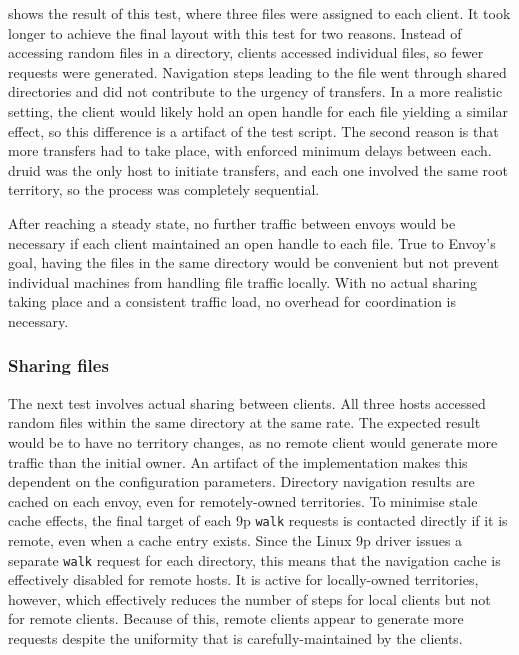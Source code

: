  shows the result of this test, where three files were assigned to each client. It took longer to achieve the final layout with this test for two reasons. Instead of accessing random files in a directory, clients accessed individual files, so fewer requests were generated. Navigation steps leading to the file went through shared directories and did not contribute to the urgency of transfers. In a more realistic setting, the client would likely hold an open handle for each file yielding a similar effect, so this difference is a artifact of the test script. The second reason is that more transfers had to take place, with enforced minimum delays between each. druid was the only host to initiate transfers, and each one involved the same root territory, so the process was completely sequential.

After reaching a steady state, no further traffic between envoys would be necessary if each client maintained an open handle to each file. True to Envoy's goal, having the files in the same directory would be convenient but not prevent individual machines from handling file traffic locally. With no actual sharing taking place and a consistent traffic load, no overhead for coordination is necessary.

\subsubsection{Sharing files}

The next test involves actual sharing between clients. All three hosts accessed random files within the same directory at the same rate. The expected result would be to have no territory changes, as no remote client would generate more traffic than the initial owner. An artifact of the implementation makes this dependent on the configuration parameters. Directory navigation results are cached on each envoy, even for remotely-owned territories. To minimise stale cache effects, the final target of each 9p \texttt{walk} requests is contacted directly if it is remote, even when a cache entry exists. Since the Linux 9p driver issues a separate \texttt{walk} request for each directory, this means that the navigation cache is effectively disabled for remote hosts. It is active for locally-owned territories, however, which effectively reduces the number of steps for local clients but not for remote clients. Because of this, remote clients appear to generate more requests despite the uniformity that is carefully-maintained by the clients.

